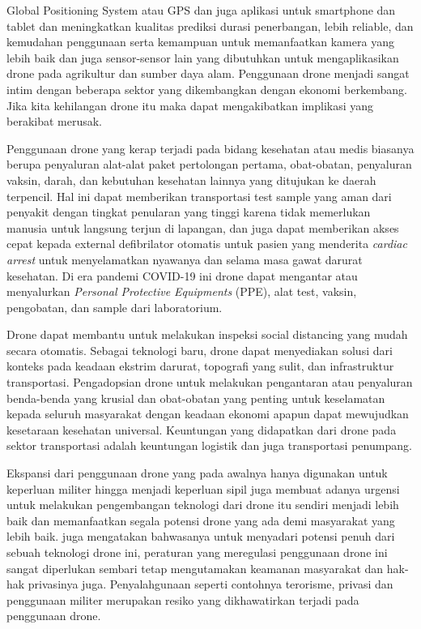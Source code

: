 Global Positioning System atau GPS dan juga aplikasi untuk smartphone dan tablet dan meningkatkan kualitas prediksi durasi penerbangan, lebih reliable, dan kemudahan penggunaan serta kemampuan untuk memanfaatkan kamera yang lebih baik dan juga sensor-sensor lain yang dibutuhkan untuk mengaplikasikan drone pada agrikultur dan sumber daya alam\citep{AYAMGA2021120677}. Penggunaan drone menjadi sangat intim dengan beberapa sektor yang dikembangkan dengan ekonomi berkembang. Jika kita kehilangan drone itu maka dapat mengakibatkan implikasi yang berakibat merusak.

Penggunaan drone yang kerap terjadi pada bidang kesehatan atau medis biasanya berupa penyaluran alat-alat paket pertolongan pertama, obat-obatan, penyaluran vaksin, darah, dan kebutuhan kesehatan lainnya yang ditujukan ke daerah terpencil. Hal ini dapat memberikan transportasi test sample yang aman dari penyakit dengan tingkat penularan yang tinggi karena tidak memerlukan manusia untuk langsung terjun di lapangan, dan juga dapat memberikan akses cepat kepada external defibrilator otomatis untuk pasien yang menderita \emph{cardiac arrest} untuk menyelamatkan nyawanya\citep{AYAMGA2021120677} dan selama masa gawat darurat kesehatan. Di era pandemi COVID-19 ini drone dapat mengantar atau menyalurkan \emph{Personal Protective Equipments} (PPE), alat test, vaksin, pengobatan, dan sample dari laboratorium. 

Drone dapat membantu untuk melakukan inspeksi social distancing yang mudah secara otomatis\citep{Ramadass2020ApplyingDL}. Sebagai teknologi baru, drone dapat menyediakan solusi dari konteks pada keadaan ekstrim darurat, topografi yang sulit, dan infrastruktur transportasi. Pengadopsian drone untuk melakukan pengantaran atau penyaluran benda-benda yang krusial dan obat-obatan yang penting untuk keselamatan kepada seluruh masyarakat dengan keadaan ekonomi apapun dapat mewujudkan kesetaraan kesehatan universal\citep{mccall2019}. Keuntungan yang didapatkan dari drone pada sektor transportasi adalah keuntungan logistik dan juga transportasi penumpang\citep{KELLERMANN2020100088}.

Ekspansi dari penggunaan drone yang pada awalnya hanya digunakan untuk keperluan militer hingga menjadi keperluan sipil juga membuat adanya urgensi untuk melakukan pengembangan teknologi dari drone itu sendiri menjadi lebih baik dan memanfaatkan segala potensi drone yang ada demi masyarakat yang lebih baik. \cite[Greenwood (2016)]{Greenwood} juga mengatakan bahwasanya untuk menyadari potensi penuh dari sebuah teknologi drone ini, peraturan yang meregulasi penggunaan drone ini sangat diperlukan sembari tetap mengutamakan keamanan masyarakat dan hak-hak privasinya juga. Penyalahgunaan seperti contohnya terorisme, privasi dan penggunaan militer merupakan resiko yang dikhawatirkan terjadi pada penggunaan drone\citep{risa2015}.

